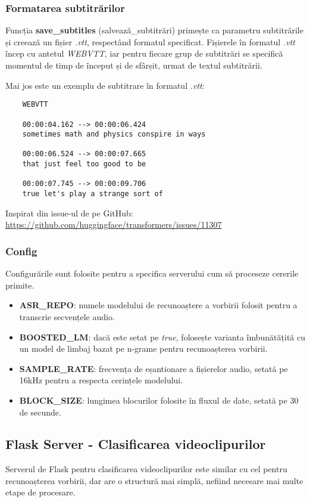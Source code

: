 \subsubsection{Formatarea subtitrărilor}
Funcția \textbf{save\_subtitles} (salvează\_subtitrări) primește ca parametru subtitrările și creează un fișier \textit{.vtt},
respectând formatul specificat. Fișierele în formatul \textit{.vtt} încep cu antetul \textit{WEBVTT},
iar pentru fiecare grup de subtitrări se specifică momentul de timp de început și de sfârșit, urmat
de textul subtitrării.
\par
Mai jos este un exemplu de subtitrare în formatul \textit{.vtt}:

\begin{verbatim}
    WEBVTT

    00:00:04.162 --> 00:00:06.424
    sometimes math and physics conspire in ways

    00:00:06.524 --> 00:00:07.665
    that just feel too good to be

    00:00:07.745 --> 00:00:09.706
    true let's play a strange sort of
\end{verbatim}


\par
Inspirat din issue-ul de pe GitHub: \url{https://github.com/huggingface/transformers/issues/11307}

\subsubsection{Config}
Configurările sunt folosite pentru a specifica serverului cum să proceseze cererile primite.
\begin{itemize}
    \item \textbf{ASR\_REPO}: numele modelului de recunoaștere a vorbirii folosit pentru a transcrie
    secvențele audio.
    \item \textbf{BOOSTED\_LM}: dacă este setat pe \textit{true}, folosește varianta îmbunătățită cu
    un model de limbaj bazat pe n-grame pentru recunoașterea vorbirii.
    \item \textbf{SAMPLE\_RATE}: frecvența de eșantionare a fișierelor audio, setată pe 16kHz pentru
    a respecta cerințele modelului.
    \item \textbf{BLOCK\_SIZE}: lungimea blocurilor folosite în fluxul de date, setată pe 30 de secunde.
\end{itemize}

\subsection{Flask Server - Clasificarea videoclipurilor}
Serverul de Flask pentru clasificarea videoclipurilor este similar cu cel pentru recunoașterea vorbirii,
dar are o structură mai simplă, nefiind necesare mai multe etape de procesare.

